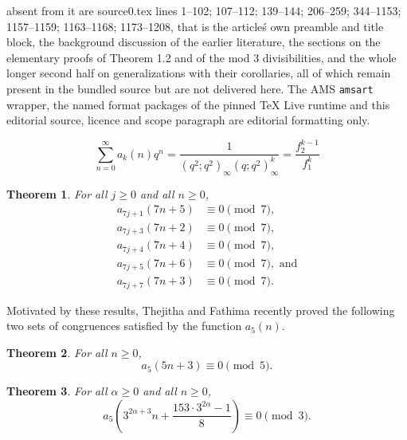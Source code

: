 \documentclass[10pt,a4paper]{amsart}
\newtheorem{theorem}{Theorem}[section]
\theoremstyle{definition}
\theoremstyle{example}
\begin{document}
absent from it are source0.tex lines 1--102; 107--112; 139--144; 206--259; 344--1153; 1157--1159; 1163--1168; 1173--1208, that is the article\'s own preamble and title block, the background discussion of the earlier literature, the sections on the elementary proofs of Theorem 1.2 and of the mod 3 divisibilities, and the whole longer second half on generalizations with their corollaries, all of which remain present in the bundled source but are not delivered here. The AMS \texttt{amsart} wrapper, the named format packages of the pinned TeX Live runtime and this editorial source, licence and scope paragraph are editorial formatting only.\par\smallskip
\setcounter{section}{1}
\setcounter{equation}{1}
\setcounter{theorem}{0}
\begin{equation}
\label{genfn_general}
\sum_{n=0}^\infty a_k(n)q^n =\frac{1}{(q^2;q^2)_\infty (q;q^2)_\infty^k} = \frac{f_2^{k-1}}{f_1^k}
\end{equation}

\setcounter{section}{1}
\setcounter{equation}{2}
\setcounter{theorem}{0}
\begin{theorem}
\label{thm:infinite_families_mod7}
For all $j\geq 0$ and all $n\geq 0$, 
\begin{align*}
a_{7j+1}(7n+5) & \equiv 0 \pmod{7},  \\
a_{7j+3}(7n+2) & \equiv 0 \pmod{7}, \\
a_{7j+4}(7n+4) & \equiv 0 \pmod{7},  \\
a_{7j+5}(7n+6) & \equiv 0 \pmod{7}, \text{\ \ and}\\
a_{7j+7}(7n+3) & \equiv 0 \pmod{7}.  
\end{align*}
\end{theorem}

Motivated by these results, Thejitha and Fathima \cite{TF} recently proved the following two sets of congruences satisfied by the function $a_5(n)$.  


\begin{theorem}
\label{thm:TF_mod5} 
For all $n\geq 0$, 
$$a_5(5n+3) \equiv 0 \pmod{5}.$$
\end{theorem}


\setcounter{section}{1}
\setcounter{equation}{2}
\setcounter{theorem}{2}
\begin{theorem}
\label{thm:TF_mod3} 
For all $\alpha \geq 0$ and all $n\geq 0$, 
$$a_{5}\left(3^{2\alpha + 3}n + \frac{153\cdot 3^{2\alpha} - 1}{8}\right)  \equiv 0 \pmod{3}.$$
\end{theorem}
\end{document}
